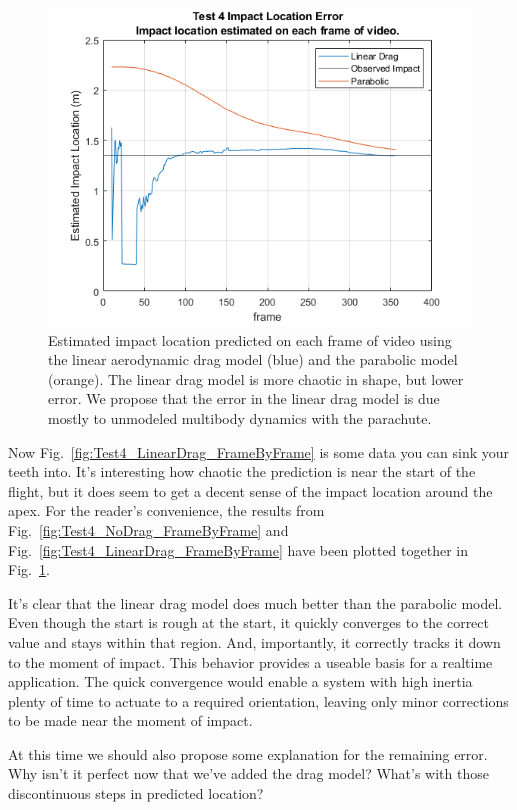 \begin{figure}[t]
\centering
\includegraphics[width=0.9\linewidth]{images/Analysis2_Test4_ImpLocPlot_Both.png}
\caption{\label{fig:Analysis2_Test4_ImpLocPlot_Both} Estimated impact location predicted on each frame of video using the linear aerodynamic drag model (blue) and the parabolic model (orange). The linear drag model is more chaotic in shape, but lower error. We propose that the error in the linear drag model is due mostly to unmodeled multibody dynamics with the parachute.}
\end{figure}

Now Fig.~\ref{fig:Test4_LinearDrag_FrameByFrame} is some data you can sink your teeth into. It's interesting how chaotic the prediction is near the start of the flight, but it does seem to get a decent sense of the impact location around the apex. For the reader's convenience, the results from Fig.~\ref{fig:Test4_NoDrag_FrameByFrame} and Fig.~\ref{fig:Test4_LinearDrag_FrameByFrame} have been plotted together in Fig.~\ref{fig:Analysis2_Test4_ImpLocPlot_Both}. 

It's clear that the linear drag model does much better than the parabolic model. Even though the start is rough at the start, it quickly converges to the correct value and stays within that region. And, importantly, it correctly tracks it down to the moment of impact. This behavior provides a useable basis for a realtime application. The quick convergence would enable a system with high inertia plenty of time to actuate to a required orientation, leaving only minor corrections to be made near the moment of impact. 

At this time we should also propose some explanation for the remaining error. Why isn't it perfect now that we've added the drag model? What's with those discontinuous steps in predicted location? 

